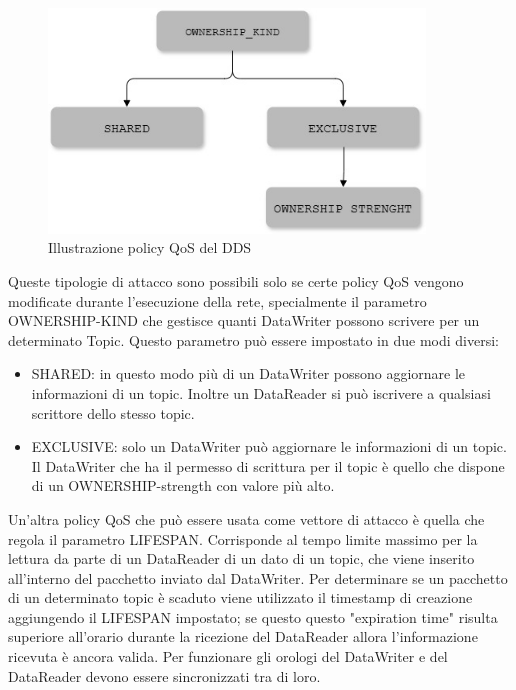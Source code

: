 %     


\begin{figure}[H]
	\centering
    \includegraphics[width=10cm, keepaspectratio]{img/Policy QoS DDS_2.jpg}
	\caption{Illustrazione policy QoS del DDS}\label{Mappa QoS}
\end{figure}

Queste tipologie di attacco sono possibili solo se certe policy QoS vengono
modificate durante l'esecuzione della rete, specialmente il parametro 
OWNERSHIP-KIND che gestisce quanti DataWriter possono scrivere per un
determinato Topic. Questo parametro può essere impostato in due modi diversi:
\begin{itemize}
    \item SHARED: in questo modo più di un DataWriter possono aggiornare le
    informazioni di un topic. Inoltre un DataReader si può iscrivere a
    qualsiasi scrittore dello stesso topic.
    \item EXCLUSIVE: solo un DataWriter può aggiornare le informazioni di un
    topic. Il DataWriter che ha il permesso di scrittura per il topic è quello
    che dispone di un OWNERSHIP-strength con valore più alto.
\end{itemize}

Un'altra policy QoS che può essere usata come vettore di attacco è quella
che regola il parametro LIFESPAN. Corrisponde al tempo limite massimo per la 
lettura da parte di un DataReader di un dato di un topic, che viene inserito
all'interno del pacchetto inviato dal DataWriter. Per determinare se un pacchetto
di un determinato topic è scaduto viene utilizzato il timestamp di creazione 
aggiungendo il LIFESPAN impostato; se questo questo "expiration time" risulta
superiore all'orario durante la ricezione del DataReader allora l'informazione
ricevuta è ancora valida. Per funzionare gli orologi del DataWriter e del DataReader
devono essere sincronizzati tra di loro.

